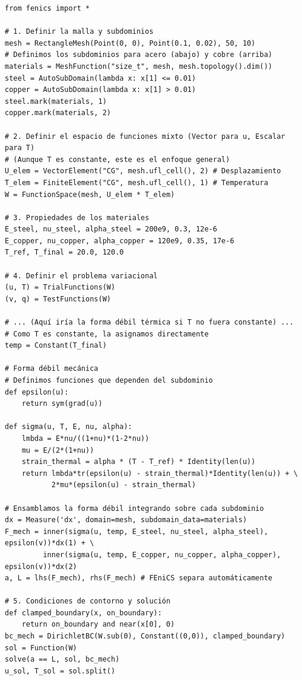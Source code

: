 \begin{codelisting}[h!]
\begin{verbatim}
from fenics import *

# 1. Definir la malla y subdominios
mesh = RectangleMesh(Point(0, 0), Point(0.1, 0.02), 50, 10)
# Definimos los subdominios para acero (abajo) y cobre (arriba)
materials = MeshFunction("size_t", mesh, mesh.topology().dim())
steel = AutoSubDomain(lambda x: x[1] <= 0.01)
copper = AutoSubDomain(lambda x: x[1] > 0.01)
steel.mark(materials, 1)
copper.mark(materials, 2)

# 2. Definir el espacio de funciones mixto (Vector para u, Escalar para T)
# (Aunque T es constante, este es el enfoque general)
U_elem = VectorElement("CG", mesh.ufl_cell(), 2) # Desplazamiento
T_elem = FiniteElement("CG", mesh.ufl_cell(), 1) # Temperatura
W = FunctionSpace(mesh, U_elem * T_elem)

# 3. Propiedades de los materiales
E_steel, nu_steel, alpha_steel = 200e9, 0.3, 12e-6
E_copper, nu_copper, alpha_copper = 120e9, 0.35, 17e-6
T_ref, T_final = 20.0, 120.0

# 4. Definir el problema variacional
(u, T) = TrialFunctions(W)
(v, q) = TestFunctions(W)

# ... (Aquí iría la forma débil térmica si T no fuera constante) ...
# Como T es constante, la asignamos directamente
temp = Constant(T_final)

# Forma débil mecánica
# Definimos funciones que dependen del subdominio
def epsilon(u):
    return sym(grad(u))

def sigma(u, T, E, nu, alpha):
    lmbda = E*nu/((1+nu)*(1-2*nu))
    mu = E/(2*(1+nu))
    strain_thermal = alpha * (T - T_ref) * Identity(len(u))
    return lmbda*tr(epsilon(u) - strain_thermal)*Identity(len(u)) + \
           2*mu*(epsilon(u) - strain_thermal)

# Ensamblamos la forma débil integrando sobre cada subdominio
dx = Measure('dx', domain=mesh, subdomain_data=materials)
F_mech = inner(sigma(u, temp, E_steel, nu_steel, alpha_steel), epsilon(v))*dx(1) + \
         inner(sigma(u, temp, E_copper, nu_copper, alpha_copper), epsilon(v))*dx(2)
a, L = lhs(F_mech), rhs(F_mech) # FEniCS separa automáticamente

# 5. Condiciones de contorno y solución
def clamped_boundary(x, on_boundary):
    return on_boundary and near(x[0], 0)
bc_mech = DirichletBC(W.sub(0), Constant((0,0)), clamped_boundary)
sol = Function(W)
solve(a == L, sol, bc_mech)
u_sol, T_sol = sol.split()

\end{verbatim}
\caption{Script de FEniCS para resolver el problema de termoelasticidad de una viga bimetálica.}
\label{lst:thermo-code}
\end{codelisting}

